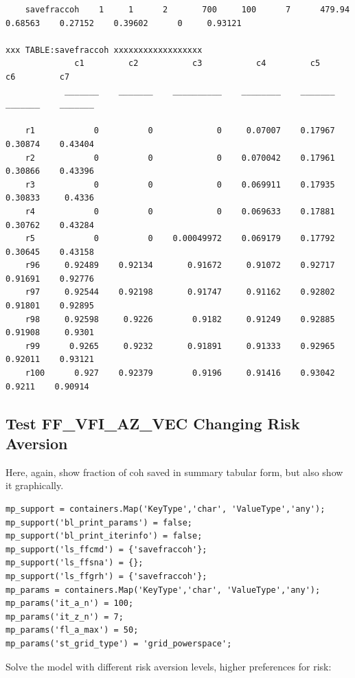 \documentclass[
]{book}
\begin{document}
\begin{verbatim}
    savefraccoh    1     1      2       700     100      7      479.94    0.68563    0.27152    0.39602      0     0.93121

xxx TABLE:savefraccoh xxxxxxxxxxxxxxxxxx
              c1         c2           c3           c4         c5         c6         c7   
            _______    _______    __________    ________    _______    _______    _______

    r1            0          0             0     0.07007    0.17967    0.30874    0.43404
    r2            0          0             0    0.070042    0.17961    0.30866    0.43396
    r3            0          0             0    0.069911    0.17935    0.30833     0.4336
    r4            0          0             0    0.069633    0.17881    0.30762    0.43284
    r5            0          0    0.00049972    0.069179    0.17792    0.30645    0.43158
    r96     0.92489    0.92134       0.91672     0.91072    0.92717    0.91691    0.92776
    r97     0.92544    0.92198       0.91747     0.91162    0.92802    0.91801    0.92895
    r98     0.92598     0.9226        0.9182     0.91249    0.92885    0.91908     0.9301
    r99      0.9265     0.9232       0.91891     0.91333    0.92965    0.92011    0.93121
    r100      0.927    0.92379        0.9196     0.91416    0.93042     0.9211    0.90914
\end{verbatim}

\hypertarget{test-ff_vfi_az_vec-changing-risk-aversion}{%
\subsection{Test FF\_VFI\_AZ\_VEC Changing Risk Aversion}\label{test-ff_vfi_az_vec-changing-risk-aversion}}

Here, again, show fraction of coh saved in summary tabular form, but
also show it graphically.

\begin{verbatim}
mp_support = containers.Map('KeyType','char', 'ValueType','any');
mp_support('bl_print_params') = false;
mp_support('bl_print_iterinfo') = false;
mp_support('ls_ffcmd') = {'savefraccoh'};
mp_support('ls_ffsna') = {};
mp_support('ls_ffgrh') = {'savefraccoh'};
mp_params = containers.Map('KeyType','char', 'ValueType','any');
mp_params('it_a_n') = 100;
mp_params('it_z_n') = 7;
mp_params('fl_a_max') = 50;
mp_params('st_grid_type') = 'grid_powerspace';
\end{verbatim}

Solve the model with different risk aversion levels, higher preferences
for risk:
\end{document}
